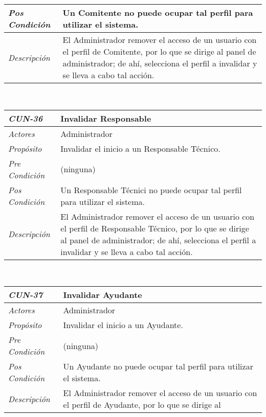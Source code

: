 \begin{center}
{\begin{tabular}{ | p{3cm} | p{12.5cm} | }
	\hline
	\raggedleft \textit{Pos Condici\'on} & Un Comitente
	no puede ocupar tal perfil para utilizar el sistema. \\
	\hline
	\raggedleft \textit{Descripci\'on} &
	El Administrador remover el acceso de un usuario con
	el perfil de Comitente, por lo que se dirige al
	panel de administrador; de ah\'i, selecciona el
	perfil a invalidar y se lleva a cabo tal acci\'on. \\
	\hline
\end{tabular}} \\[1cm]
\hypertarget{CUN-36}{%
\begin{tabular}{ | p{3cm} | p{12.5cm} | }
	\hline
	\rowcolor{lightgray}
	\hfil \textbf{\textit{CUN-36}} &
	\hfil \textbf{Invalidar Responsable} \\
	\hline
	\raggedleft \textit{Actores} & Administrador \\
	\hline
	\raggedleft \textit{Prop\'osito} & Invalidar el
	inicio a un Responsable T\'ecnico. \\
	\hline
	\raggedleft \textit{Pre Condici\'on} & (ninguna) \\
	\hline
	\raggedleft \textit{Pos Condici\'on} & Un Responsable
	T\'ecnici no puede ocupar tal perfil para utilizar el
	sistema. \\
	\hline
	\raggedleft \textit{Descripci\'on} &
	El Administrador remover el acceso de un usuario con
	el perfil de Responsable T\'ecnico, por lo que se dirige
	al panel de administrador; de ah\'i, selecciona el
	perfil a invalidar y se lleva a cabo tal acci\'on. \\
	\hline
\end{tabular}} \\[1cm]
\hypertarget{CUN-37}{%
\begin{tabular}{ | p{3cm} | p{12.5cm} | }
	\hline
	\rowcolor{lightgray}
	\hfil \textbf{\textit{CUN-37}} &
	\hfil \textbf{Invalidar Ayudante} \\
	\hline
	\raggedleft \textit{Actores} & Administrador \\
	\hline
	\raggedleft \textit{Prop\'osito} & Invalidar el
	inicio a un Ayudante. \\
	\hline
	\raggedleft \textit{Pre Condici\'on} & (ninguna) \\
	\hline
	\raggedleft \textit{Pos Condici\'on} & Un Ayudante
	no puede ocupar tal perfil para utilizar el sistema. \\
	\hline
	\raggedleft \textit{Descripci\'on} &
	El Administrador remover el acceso de un usuario con
	el perfil de Ayudante, por lo que se dirige al

\end{tabular}}
\end{center}
